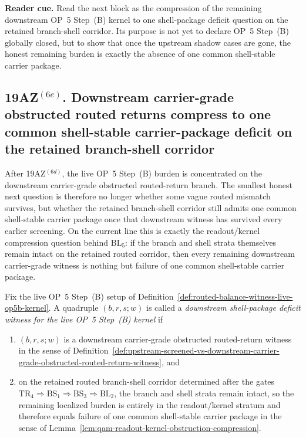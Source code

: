 \noindent\textbf{Reader cue.} Read the next block as the compression of the remaining downstream OP~5 Step~(B) kernel to one shell-package deficit question on the retained branch-shell corridor. Its purpose is not yet to declare OP~5 Step~(B) globally closed, but to show that once the upstream shadow cases are gone, the honest remaining burden is exactly the absence of one common shell-stable carrier package.

\subsection*{19AZ$^{(6e)}$. Downstream carrier-grade obstructed routed returns compress to one common shell-stable carrier-package deficit on the retained branch-shell corridor}
\label{sec:downstream-carrier-grade-obstructed-routed-returns-compress-shell-stable-carrier-package-deficit}
After 19AZ$^{(6d)}$, the live OP~5 Step~(B) burden is concentrated on the downstream carrier-grade obstructed routed-return branch. The smallest honest next question is therefore no longer whether some vague routed mismatch survives, but whether the retained branch-shell corridor still admits one common shell-stable carrier package once that downstream witness has survived every earlier screening. On the current line this is exactly the readout/kernel compression question behind \(\mathrm{BL}_5\): if the branch and shell strata themselves remain intact on the retained routed corridor, then every remaining downstream carrier-grade witness is nothing but failure of one common shell-stable carrier package.

\begin{definition}
\label{def:downstream-shell-package-deficit-witness-live-op5b-kernel}
Fix the live OP~5 Step~(B) setup of Definition~\ref{def:routed-balance-witness-live-op5b-kernel}. A quadruple $(b,r,s;w)$ is called a \emph{downstream shell-package deficit witness for the live OP~5 Step~(B) kernel} if
\begin{enumerate}[leftmargin=2em,label=(\roman*)]
 \item $(b,r,s;w)$ is a downstream carrier-grade obstructed routed-return witness in the sense of Definition~\ref{def:upstream-screened-vs-downstream-carrier-grade-obstructed-routed-return-witness}, and
 \item on the retained routed branch-shell corridor determined after the gates \(\mathrm{TR}_4\Rightarrow\mathrm{BS}_1\Rightarrow\mathrm{BS}_3\Rightarrow\mathrm{BL}_2\), the branch and shell strata remain intact, so the remaining localized burden is entirely in the readout/kernel stratum and therefore equals failure of one common shell-stable carrier package in the sense of Lemma~\ref{lem:qam-readout-kernel-obstruction-compression}.
\end{enumerate}
\end{definition}

